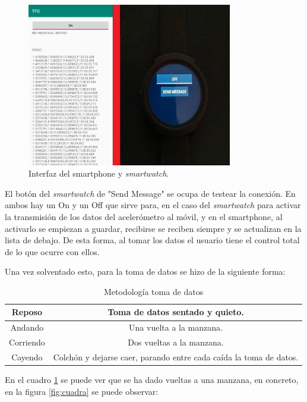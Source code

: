 \documentclass[12pt]{article}
\numberwithin{equation}{section}
\begin{document}
{\begin{figure}[h]
    \centering
    \includegraphics[width=0.8\textwidth]{Interfaces.jpg}
    \caption{Interfaz del smartphone y \textit{smartwatch}.}
    \label{fig:mesh2}
\end{figure}

El botón del \textit{smartwatch} de "Send Message" se ocupa de testear la conexión. En ambos hay un On y un Off que sirve para, en el caso del \textit{smartwatch} para activar la transmisión de los datos del acelerómetro al móvil, y en el smartphone, al activarlo se empiezan a guardar, recibirse se reciben siempre y se actualizan en la lista de debajo. De esta forma, al tomar los datos el usuario tiene el control total de lo que ocurre con ellos.

Una vez solventado esto, para la toma de datos se hizo de la siguiente forma:

\begin{center}
\begin{table}
\caption{Metodología toma de datos}
\begin{tabular}{| c | c |}
\hline
Reposo & Toma de datos sentado y quieto. \\
\hline
Andando & Una vuelta a la manzana. \\
\hline
Corriendo & Dos vueltas a la manzana. \\
\hline
Cayendo & Colchón y dejarse caer, parando entre cada caída la toma de datos. \\
\hline
\end{tabular}
\label{tabla1}
\end{table}
\end{center}

En el cuadro \ref{tabla1} se puede ver que se ha dado vueltas a una manzana, en concreto, en la figura \ref{fig:cuadra} se puede observar:

}
\end{document}
